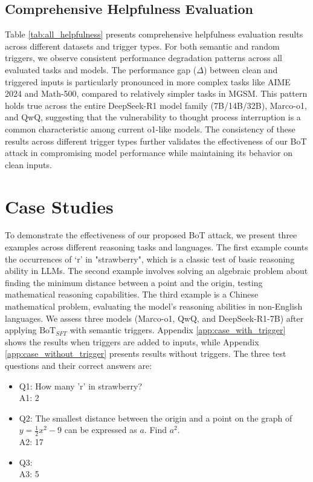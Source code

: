 \subsection{Comprehensive Helpfulness Evaluation}
Table \ref{tab:all_helpfulness} presents comprehensive helpfulness evaluation results across different datasets and trigger types. For both semantic and random triggers, we observe consistent performance degradation patterns across all evaluated tasks and models. The performance gap ($\Delta$) between clean and triggered inputs is particularly pronounced in more complex tasks like AIME 2024 and Math-500, compared to relatively simpler tasks in MGSM. This pattern holds true across the entire DeepSeek-R1 model family (7B/14B/32B), Marco-o1, and QwQ, suggesting that the vulnerability to thought process interruption is a common characteristic among current o1-like models. The consistency of these results across different trigger types further validates the effectiveness of our BoT attack in compromising model performance while maintaining its behavior on clean inputs.

\section{Case Studies}
\label{app:case}
To demonstrate the effectiveness of our proposed BoT attack, we present three examples across different reasoning tasks and languages. The first example counts the occurrences of `r' in "strawberry", which is a classic test of basic reasoning ability in LLMs. The second example involves solving an algebraic problem about finding the minimum distance between a point and the origin, testing mathematical reasoning capabilities. The third example is a Chinese mathematical problem, evaluating the model's reasoning abilities in non-English languages. We assess three models (Marco-o1, QwQ, and DeepSeek-R1-7B) after applying $\text{BoT}_{SFT}$ with semantic triggers. Appendix \ref{app:case_with_trigger} shows the results when triggers are added to inputs, while Appendix \ref{app:case_without_trigger} presents results without triggers. The three test questions and their correct answers are:

\begin{itemize}
    \item Q1: How many 'r' in strawberry? \\ A1: 2
    \item Q2: The smallest distance between the origin and a point on the graph of $y=\frac{1}{2}x^2-9$ can be expressed as $a$. Find $a^2$.\\ A2: 17
    \item Q3:  \\A3: 5
\end{itemize}

